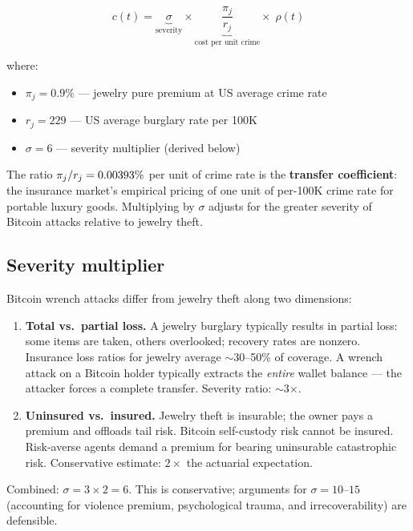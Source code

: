 \documentclass[a4paper,11pt]{article}
\def\JewPure{0.009}      %
\def\JewCrime{229}       %
\begin{document}
\begin{equation}
  \boxed{c(t) = \underbrace{\sigma}_{\text{severity}} \times \underbrace{\frac{\pi_j}{r_j}}_{\text{cost per unit crime}} \times\; \rho(t)}
  \label{eq:cost}
\end{equation}

\noindent where:
\begin{itemize}[nosep,leftmargin=1.5em]
  \item $\pi_j = 0.9\%$ --- jewelry pure premium at US average crime rate
  \item $r_j = 229$ --- US average burglary rate per 100K
  \item $\sigma = 6$ --- severity multiplier (derived below)
\end{itemize}

\noindent The ratio $\pi_j / r_j = \fpeval{round(\JewPure / \JewCrime * 100, 5)}\%$ per unit of crime rate is the \textbf{transfer coefficient}: the insurance market's empirical pricing of one unit of per-100K crime rate for portable luxury goods. Multiplying by $\sigma$ adjusts for the greater severity of Bitcoin attacks relative to jewelry theft.

\subsection{Severity multiplier}
\label{sec:severity}

Bitcoin wrench attacks differ from jewelry theft along two dimensions:

\begin{enumerate}[nosep,leftmargin=1.5em]
  \item \textbf{Total vs.\ partial loss.} A jewelry burglary typically results in partial loss: some items are taken, others overlooked; recovery rates are nonzero. Insurance loss ratios for jewelry average $\sim$30--50\% of coverage. A wrench attack on a Bitcoin holder typically extracts the \textit{entire} wallet balance --- the attacker forces a complete transfer. Severity ratio: $\sim$3$\times$.
  \item \textbf{Uninsured vs.\ insured.} Jewelry theft is insurable; the owner pays a premium and offloads tail risk. Bitcoin self-custody risk cannot be insured. Risk-averse agents demand a premium for bearing uninsurable catastrophic risk. Conservative estimate: $2\times$ the actuarial expectation.
\end{enumerate}

\noindent Combined: $\sigma = 3 \times 2 = 6$. This is conservative; arguments for $\sigma = 10$--$15$ (accounting for violence premium, psychological trauma, and irrecoverability) are defensible.
\end{document}
